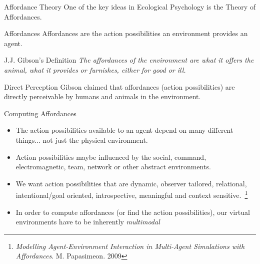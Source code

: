 \documentclass[aspectratio=1610,xcolor=dvipsnames,t]{beamer}
\begin{document}
\begin{frame}{Affordance Theory} 
    One of the key ideas in Ecological Psychology is the Theory of Affordances.

    \begin{block}{Affordances} 
        Affordances are the action possibilities an environment provides an agent.
    \end{block} 
\pause
    \begin{block}{J.J. Gibson's Definition} 
        \emph{The affordances of the environment are what it offers the animal, what it
        provides or furnishes, either for good or ill.} 
    \end{block} 
\pause 
    \begin{block}{Direct Perception} 
        Gibson claimed that affordances (action possibilities) are directly perceivable
        by humans and animals in the environment. 
    \end{block} 
\end{frame} 

\begin{frame}{Computing Affordances} 
    \begin{itemize} 
        \item The action possibilities available to an agent depend on many
            different things... not just the physical environment. 
        \item Action possibilities maybe influenced by the social, command,
            electromagnetic, team, network or other abstract environments. 
        \item We want action possibilities that are dynamic, observer
            tailored, relational, intentional/goal oriented, introspective,
            meaningful and context sensitive.~\footnote{\emph{Modelling
                Agent-Environment Interaction in Multi-Agent Simulations with
            Affordances}.  M.  Papasimeon. 2009}
        \item In order to compute affordances (or find the action
            possibilities), our virtual environments have to be
            inherently \emph{multimodal} 
    \end{itemize} 
\end{frame} 
\end{document}
